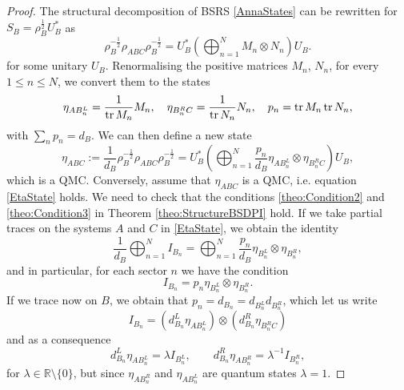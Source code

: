 \documentclass[11pt]{article}
\theoremstyle{newdefinition}
\theoremstyle{newplain}
\theoremstyle{myplain}
\DeclareMathOperator{\1}{\mathds{1}}
\newcommand{\PCR}[1]{{\color{blue}#1}}
\begin{document}
\begin{proof}
    The structural decomposition of BSRS  \eqref{AnnaStates}  can be rewritten  \PCR{for $S_B=\rho_B^{\frac{1}{2}}U_B^*$} as 
    \begin{equation}
        \rho_B^{-\frac{1}{2}}\rho_{ABC}\rho_B^{-\frac{1}{2}}=U_B^*\left(  \bigoplus_{n=1}^N M_n \otimes N_n \right) U_B.
    \end{equation}
   for some unitary $U_B$. Renormalising the positive matrices $M_n$, $N_n$, for every $1 \leq n\leq N$,  we convert them to the states
    \begin{equation}
        \eta_{AB_n^L}=\frac{1}{\tr M_n}M_n, \quad \eta_{B_n^RC}=\frac{1}{\tr N_n}N_n, \quad p_n=\tr M_n\tr N_n, 
    \end{equation}  with $\sum_n p_n=d_B$. We can then define a new state
    \begin{equation}\label{EtaState}
          \eta_{ABC}:=\frac{1}{d_B} \rho_B^{-\frac{1}{2}}\rho_{ABC}\rho_B^{-\frac{1}{2}}=U_B^* \left(\bigoplus_{n=1}^N \frac{p_n}{d_B}  \eta_{AB_n^L} \otimes \eta_{B_n^RC}\right)U_B,
    \end{equation}
    which is a QMC.   Conversely, assume that $\eta_{ABC}$ is a QMC, i.e. equation \eqref{EtaState} holds. We need to check that the conditions \ref{theo:Condition2}  and \ref{theo:Condition3} in Theorem \ref{theo:StructureBSDPI} hold. If we take partial traces on the systems $A$ and $C$ in \eqref{EtaState}, we obtain the identity
    \begin{equation}
        \frac{1}{d_B}\bigoplus_{n=1}^N I_{B_n}=\bigoplus_{n=1}^N \frac{p_n}{d_B}  \eta_{B_n^L} \otimes \eta_{B_n^R},
    \end{equation}
and in particular, for each sector $n$ we have the condition
\begin{equation}
    I_{B_n}=p_n \eta_{B_n^L} \otimes \eta_{B_n^R}.
\end{equation}
If we trace now on $B$, we obtain that $p_n=d_{B_n}=d_{B_n^L}d_{B_n^R}$, which let us write
    \begin{equation}
        I_{B_n}=(d_{B_n}^L\eta_{AB_n^L})\otimes (d_{B_n}^R \eta_{B_n^RC})
    \end{equation}
   and as a consequence
   \begin{equation}
       d_{B_n}^L\eta_{AB_n^L}=\lambda I_{B_n^L}, \qquad  d_{B_n}^R \eta_{AB_n^R}=\lambda^{-1} I_{B_n^R},
   \end{equation}
for $\lambda \in \mathbb{R}\setminus \{0\}$, but since $\eta_{AB_n^R}$ and $\eta_{AB_n^L}$ are quantum states $\lambda=1$.
\end{proof}
\end{document}
